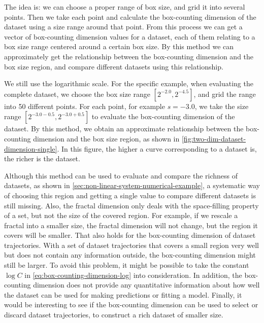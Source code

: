 The idea is: we can choose a proper range of box size, and grid it into several points.
Then we take each point and calculate the box-counting dimension of the dataset using a size range around that point.
From this process we can get a vector of box-counting dimension values for a dataset, each of them relating to a box size range centered around a certain box size.
By this method we can approximately get the relationship between the box-counting dimension and the box size region, and compare different datasets using this relationship.

We still use the logarithmic scale.
For the specific example, when evaluating the complete dataset, we choose the box size range $[2^{-2.0}, 2^{-4.5}]$, and grid the range into 50 different points.
For each point, for example $s = -3.0$, we take the size range $[2^{-3.0-0.5}, 2^{-3.0+0.5}]$ to evaluate the box-counting dimension of the dataset.
By this method, we obtain an approximate relationship between the box-counting dimension and the box size region, as shown in \cref{fig:two-dim-dataset-dimension-single}.
In this figure, the higher a curve corresponding to a dataset is, the richer is the dataset.


Although this method can be used to evaluate and compare the richness of datasets, as shown in \cref{sec:non-linear-system-numerical-example}, a systematic way of choosing this region and getting a single value to compare different datasets is still missing.
Also, the fractal dimension only deals with the space-filling property of a set, but not the size of the covered region.
For example, if we rescale a fractal into a smaller size, the fractal dimension will not change, but the region it covers will be smaller.
That also holds for the box-counting dimension of dataset trajectories.
With a set of dataset trajectories that covers a small region very well but does not contain any information outside, the box-counting dimension might still be larger.
To avoid this problem, it might be possible to take the constant $\log C$ in \cref{eq:box-counting-dimension-log} into consideration.
In addition, the box-counting dimension does not provide any quantitative information about how well the dataset can be used for making predictions or fitting a model.
Finally, it would be interesting to see if the box-counting dimension can be used to select or discard dataset trajectories, to construct a rich dataset of smaller size.

